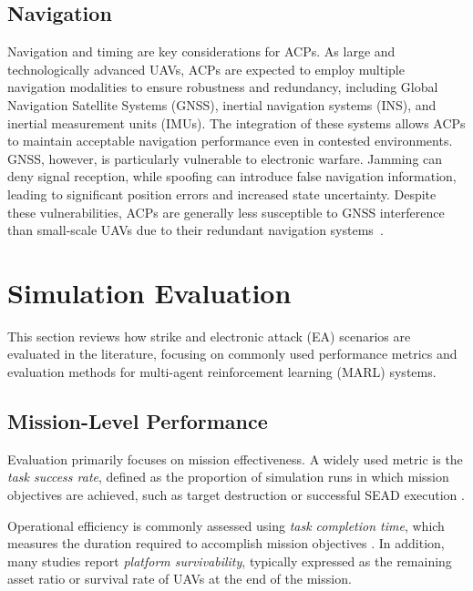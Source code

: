 \subsection{Navigation}
Navigation and timing are key considerations for ACPs. As large and technologically advanced UAVs, ACPs are expected to employ multiple navigation modalities to ensure robustness and redundancy, including Global Navigation Satellite Systems (GNSS), inertial navigation systems (INS), and inertial measurement units (IMUs). The integration of these systems allows ACPs to maintain acceptable navigation performance even in contested environments. GNSS, however, is particularly vulnerable to electronic warfare. Jamming can deny signal reception, while spoofing can introduce false navigation information, leading to significant position errors and increased state uncertainty. Despite these vulnerabilities, ACPs are generally less susceptible to GNSS interference than small-scale UAVs due to their redundant navigation systems~\cite{Rados2024JammingSpoofingGNSS, gunzinger2024cca}.


\section{Simulation Evaluation}

This section reviews how strike and electronic attack (EA) scenarios are evaluated in the literature, focusing on commonly used performance metrics and evaluation methods for multi-agent reinforcement learning (MARL) systems.

\subsection{Mission-Level Performance}

Evaluation primarily focuses on mission effectiveness. A widely used metric is the \textit{task success rate}, defined as the proportion of simulation runs in which mission objectives are achieved, such as target destruction or successful SEAD execution \cite{xu2025mdrl_uav_combat, Lee2023MUMTSEAD, Fang2021CollaborativeCombat}. 

Operational efficiency is commonly assessed using \textit{task completion time}, which measures the duration required to accomplish mission objectives \cite{xu2025mdrl_uav_combat, Fang2021CollaborativeCombat}. In addition, many studies report \textit{platform survivability}, typically expressed as the remaining asset ratio or survival rate of UAVs at the end of the mission. 

